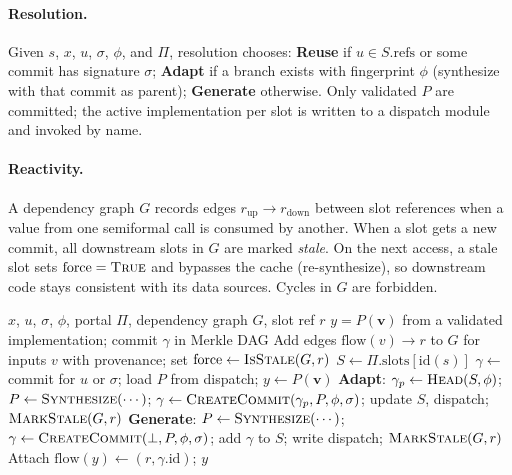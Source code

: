 \paragraph{Resolution.}
Given $s$, $x$, $u$, $\sigma$, $\phi$, and $\Pi$, resolution chooses:
\textbf{Reuse} if $u \in S.\mathrm{refs}$ or some commit has signature
$\sigma$; \textbf{Adapt} if a branch exists with fingerprint $\phi$ (synthesize
with that commit as parent); \textbf{Generate} otherwise.  Only validated $P$
are committed; the active implementation per slot is written to a dispatch
module and invoked by name.

\paragraph{Reactivity.}
A dependency graph $G$ records edges $r_{\mathrm{up}} \to r_{\mathrm{down}}$
between slot references when a value from one semiformal call is consumed by
another.  When a slot gets a new commit, all downstream slots in $G$ are
marked \emph{stale}.  On the next access, a stale slot sets
$\mathrm{force} = \textsc{True}$ and bypasses the cache (re-synthesize), so
downstream code stays consistent with its data sources.  Cycles in $G$ are
forbidden.

\begin{algorithm}[t]
\caption{\textsc{Resolve-and-Dispatch} (core)}
\label{alg:abbrev-resolve}
\begin{algorithmic}[1]
\Require $x$, $u$, $\sigma$, $\phi$, portal $\Pi$, dependency graph $G$, slot ref $r$
\Ensure $y = P(\mathbf{v})$ from a validated implementation; commit $\gamma$ in Merkle DAG
\State Add edges $\mathrm{flow}(v) \to r$ to $G$ for inputs $v$ with provenance; set $\mathrm{force} \gets \textsc{IsStale}(G, r)$
\State $S \gets \Pi.\mathrm{slots}[\mathrm{id}(s)]$
  \State $\gamma \gets$ commit for $u$ or $\sigma$; load $P$ from dispatch; $y \gets P(\mathbf{v})$
  \State \textbf{Adapt}: $\gamma_p \gets \textsc{Head}(S, \phi)$; $P \gets \textsc{Synthesize}(\cdots)$; $\gamma \gets \textsc{CreateCommit}(\gamma_p, P, \phi, \sigma)$; update $S$, dispatch; $\textsc{MarkStale}(G, r)$
\Else
  \State \textbf{Generate}: $P \gets \textsc{Synthesize}(\cdots)$; $\gamma \gets \textsc{CreateCommit}(\bot, P, \phi, \sigma)$; add $\gamma$ to $S$; write dispatch; $\textsc{MarkStale}(G, r)$
\EndIf
\State Attach $\mathrm{flow}(y) \gets (r, \gamma.\mathrm{id})$; \Return $y$
\end{algorithmic}
\end{algorithm}



